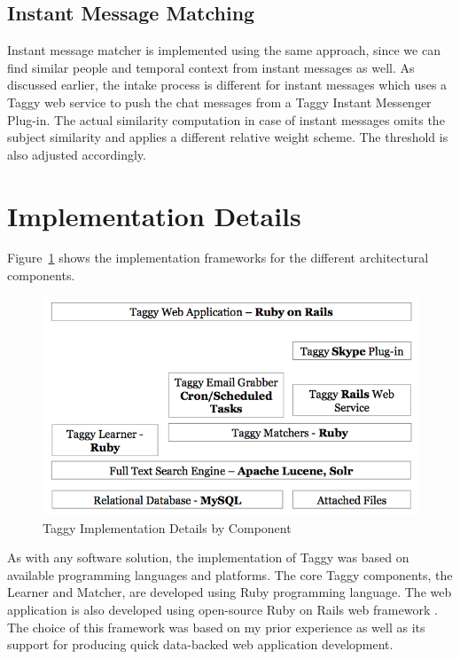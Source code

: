\subsection{Instant Message Matching}
Instant message matcher is implemented using the same approach, since we can find similar people and temporal context from instant messages as well. As discussed earlier, the intake process is different for instant messages which uses a Taggy web service to push the chat messages from a Taggy Instant Messenger Plug-in. The actual similarity computation in case of instant messages omits the subject similarity and applies a different relative weight scheme. The threshold is also adjusted accordingly.

\section{Implementation Details}
Figure~\ref{fig:implementation} shows the implementation frameworks for the different architectural components.


\begin{figure}[bt]
	\centering
	\includegraphics[width=\textwidth]{Implementation.png}
    \caption{Taggy Implementation Details by Component}
	\label{fig:implementation}
\end{figure}



As with any software solution, the implementation of Taggy was based on available programming languages and platforms. The core Taggy components, the Learner and Matcher, are developed using Ruby programming language\cite{ruby}. The web application is also developed using open-source Ruby on Rails web framework \cite{ruby_on_rails}. The choice of this framework was based on my prior experience as well as its support for producing quick data-backed web application development.

